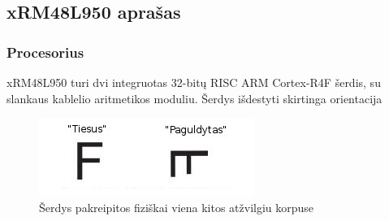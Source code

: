 \documentclass[a4paper, 12pt]{article} %
\begin{document}
\begin{onehalfspacing}
\subsection{xRM48L950 apra\v{s}as}
 
\subsubsection{Procesorius}
xRM48L950 turi dvi integruotas 32-bit\k{u} RISC ARM Cortex-R4F \v{s}erdis, su slankaus kablelio aritmetikos moduliu. \v{S}erdys i\v{s}destyti skirtinga orientacija  
\begin{figure}[H] %
\centering %
\includegraphics[scale=2.5]{pav/orentacija.jpg} %
\captionsetup{labelformat=numbfirst} %
\captionsetup{labelseparator=tarpas}
\caption{\v{S}erdys pakreipitos fizi\v{s}kai viena kitos at\v{z}vilgiu korpuse}
\label{vienas}
\end{figure}


\end{onehalfspacing}
\end{document}

